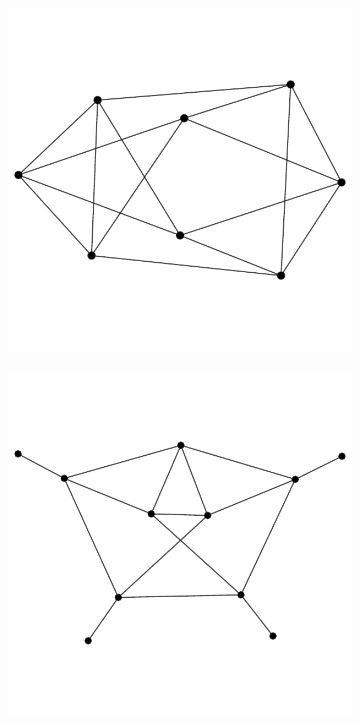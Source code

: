\documentclass[11pt,a4paper]{article}
\renewcommand{\|}{\rule[-0.4ex]{0.2ex}{1.2em}}
\begin{document}
\begin{figure}[htb]
	\begin{subfigure}[b]{.24 \textwidth}
		\includegraphics[width=\linewidth]{graph_comp}
		\subcaption{}
	\end{subfigure}
	\begin{subfigure}[b]{.24 \textwidth}
		\includegraphics[width=\linewidth]{graph_dec1}

\end{subfigure}
\end{figure}
\end{document}
